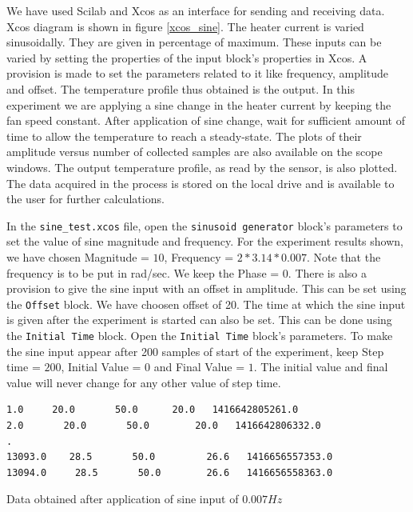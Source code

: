 We have used Scilab and Xcos as an interface for sending and receiving data. 
Xcos diagram is shown in figure \ref{xcos_sine}.
The heater current is varied sinusoidally. They are given in percentage of maximum. These inputs can be varied by setting the properties of the input block's properties in Xcos. A provision is made to set the parameters related to it like frequency, amplitude 
and offset. The temperature profile thus obtained is the output. In this experiment we are applying a sine change in the heater current by keeping the fan speed constant. After application of sine change, wait for sufficient amount of time to allow the temperature to reach a steady-state. The plots of their amplitude versus number of collected samples are also available on the scope windows. The output temperature profile, as read by the sensor, is also plotted. The data acquired in the process is stored on the local drive and is available to the user for further calculations.

 In the {\tt sine\_test.xcos} file, open the {\tt sinusoid generator} block's parameters to set the value of sine magnitude and frequency. For the experiment results shown, we have chosen Magnitude = $10$, Frequency = $2*3.14*0.007$. Note that the frequency is to be put in rad/sec. We keep the Phase = $0$. There is also a provision to give the sine input with an offset in amplitude. This can be set using the {\tt Offset} block. We have choosen offset of 20. The time at which the sine input is given after the experiment is started can also be set. This can be done using the {\tt Initial Time} block. Open the {\tt Initial Time} block's parameters. To make the sine input appear after 200 samples of start of the experiment, keep Step time = $200$, Initial Value = $0$ and Final Value = $1$. The initial value and final value will never change for any other value of step time.


\begin{table}
\begin{verbatim}
1.0     20.0       50.0      20.0   1416642805261.0
2.0       20.0       50.0        20.0   1416642806332.0
.
13093.0    28.5       50.0         26.6   1416656557353.0
13094.0     28.5       50.0        26.6   1416656558363.0
\end{verbatim}
\caption{Data obtained after application of sine input of $0.007Hz$}
\label{sinedata}
\end{table}


